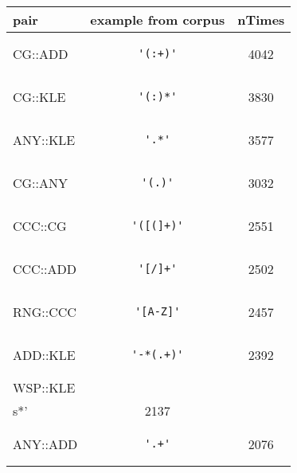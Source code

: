 \begin{center}
\begin{tabular}{lcc}
\toprule
pair & example from corpus & nTimes \\ 
\midrule
CG::ADD & \begin{minipage}{2in}
\begin{verbatim}
'(:+)'\end{verbatim}
\end{minipage}
& 4042 \\ 
\midrule
CG::KLE & \begin{minipage}{2in}
\begin{verbatim}
'(:)*'\end{verbatim}
\end{minipage}
& 3830 \\ 
\midrule
ANY::KLE & \begin{minipage}{2in}
\begin{verbatim}
'.*'\end{verbatim}
\end{minipage}
& 3577 \\ 
\midrule
CG::ANY & \begin{minipage}{2in}
\begin{verbatim}
'(.)'\end{verbatim}
\end{minipage}
& 3032 \\ 
\midrule
CCC::CG & \begin{minipage}{2in}
\begin{verbatim}
'([(]+)'\end{verbatim}
\end{minipage}
& 2551 \\ 
\midrule
CCC::ADD & \begin{minipage}{2in}
\begin{verbatim}
'[/]+'\end{verbatim}
\end{minipage}
& 2502 \\ 
\midrule
RNG::CCC & \begin{minipage}{2in}
\begin{verbatim}
'[A-Z]'\end{verbatim}
\end{minipage}
& 2457 \\ 
\midrule
ADD::KLE & \begin{minipage}{2in}
\begin{verbatim}
'-*(.+)'\end{verbatim}
\end{minipage}
& 2392 \\ 
\midrule
WSP::KLE & \begin{minipage}{2in}
\begin{verbatim}
'\\s*'\end{verbatim}
\end{minipage}
& 2137 \\ 
\midrule
ANY::ADD & \begin{minipage}{2in}
\begin{verbatim}
'.+'\end{verbatim}
\end{minipage}
& 2076 \\ 
\bottomrule
\end{tabular}
\end{center}

